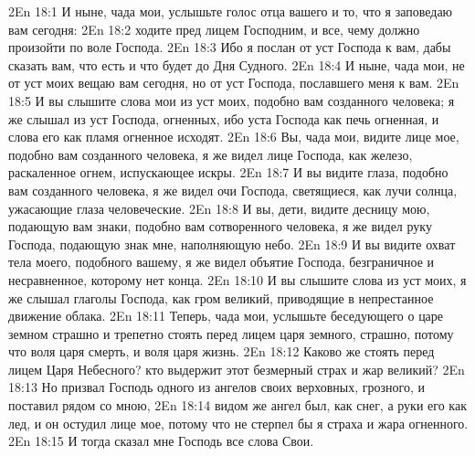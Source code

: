 \vs 2En 18:1
И ныне, чада мои, услышьте голос отца вашего и то, что я заповедаю вам сегодня:
\vs 2En 18:2
ходите пред лицем Господним, и все, чему должно произойти по воле Господа.
\vs 2En 18:3
Ибо я послан от уст Господа к вам, дабы сказать вам, что есть и что будет до Дня Судного.
\vs 2En 18:4
И ныне, чада мои, не от уст моих вещаю вам сегодня, но от уст Господа, пославшего меня к вам.
\vs 2En 18:5
И вы слышите слова мои из уст моих, подобно вам созданного человека; я же слышал из уст Господа, огненных, ибо уста Господа как печь огненная, и слова его как пламя огненное исходят.
\vs 2En 18:6
Вы, чада мои, видите лице мое, подобно вам созданного человека, я же видел лице Господа, как железо, раскаленное огнем, испускающее искры.
\vs 2En 18:7
И вы видите глаза, подобно вам созданного человека, я же видел очи Господа, светящиеся, как лучи солнца, ужасающие глаза человеческие.
\vs 2En 18:8
И вы, дети, видите десницу мою, подающую вам знаки, подобно вам сотворенного человека, я же видел руку Господа, подающую знак мне, наполняющую небо.
\vs 2En 18:9
И вы видите охват тела моего, подобного вашему, я же видел объятие Господа, безграничное и несравненное, которому нет конца.
\vs 2En 18:10
И вы слышите слова из уст моих, я же слышал глаголы Господа, как гром великий, приводящие в непрестанное движение облака.
\vs 2En 18:11
Теперь, чада мои, услышьте беседующего о царе земном страшно и трепетно стоять перед лицем царя земного, страшно, потому что воля царя смерть, и воля царя жизнь.
\vs 2En 18:12
Каково же стоять перед лицем Царя Небесного? кто выдержит этот безмерный страх и жар великий?
\vs 2En 18:13
Но призвал Господь одного из ангелов своих верховных, грозного, и поставил рядом со мною,
\vs 2En 18:14
видом же ангел был, как снег, а руки его как лед, и он остудил лице мое, потому что не стерпел бы я страха и жара огненного.
\vs 2En 18:15
И тогда сказал мне Господь все слова Свои.


